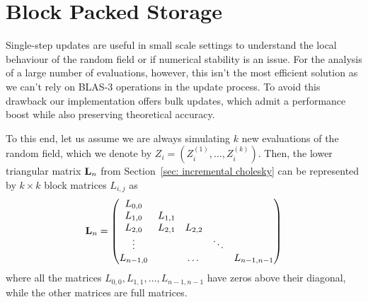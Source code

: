 \section{Block Packed Storage}\label{sec: memory layout}
Single-step updates are useful in small scale settings to understand the local behaviour of the random field or if numerical stability is an issue. For the analysis of a large number of evaluations, however, this isn't the most efficient solution as we can't rely on BLAS-3 operations in the update process. To avoid this drawback our implementation offers bulk updates, which admit a performance boost while also preserving theoretical accuracy.

To this end, let us assume we are always simulating $k$ new evaluations of the random field, which we denote by $Z_{i} = (Z_{i}^{(1)},...,Z_{i}^{(k)})$. Then, the lower triangular matrix \(\mathbf{L}_n\) from Section~\ref{sec: incremental cholesky} can be represented by \(k\times k\) block matrices \(L_{i,j}\) as
\[
	\mathbf{L}_n = \begin{pmatrix}
		L_{0,0} & \\
		L_{1,0} & L_{1,1} \\
		L_{2,0} & L_{2,1} & L_{2,2} \\
		\vdots & & & \ddots \\
		L_{n-1,0} & & \dots & & L_{n-1,n-1}
	\end{pmatrix}
\]
where all the matrices \(L_{0,0},L_{1,1},\dots, L_{n-1,n-1}\) have zeros above their diagonal,
while the other matrices are full matrices.

